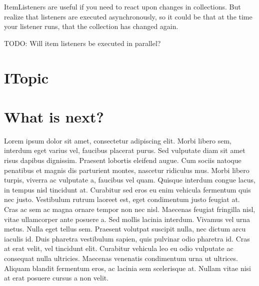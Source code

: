 ItemListeners are useful if you need to react upon changes in collections. But realize that listeners 
are executed asynchronously, so it could be that at the time your listener runs, that the collection 
has changed again.

TODO: Will item listeners be executed in parallel?

\section{ITopic}

\section{What is next?}
Lorem ipsum dolor sit amet, consectetur adipiscing elit. Morbi libero sem,
interdum eget varius vel, faucibus placerat purus. Sed vulputate diam sit amet
risus dapibus dignissim. Praesent lobortis eleifend augue. Cum sociis natoque
penatibus et magnis dis parturient montes, nascetur ridiculus mus. Morbi libero
turpis, viverra ac vulputate a, faucibus vel quam. Quisque interdum congue
lacus, in tempus nisl tincidunt at. Curabitur sed eros eu enim vehicula
fermentum quis nec justo. Vestibulum rutrum laoreet est, eget condimentum justo
feugiat at. Cras ac sem ac magna ornare tempor non nec nisl. Maecenas feugiat
fringilla nisl, vitae ullamcorper ante posuere a. Sed mollis lacinia interdum.
Vivamus vel urna metus. Nulla eget tellus sem. Praesent volutpat suscipit nulla,
nec dictum arcu iaculis id. Duis pharetra vestibulum sapien, quis pulvinar odio
pharetra id. Cras at erat velit, vel tincidunt elit. Curabitur vehicula leo eu
odio vulputate ac consequat nulla ultricies. Maecenas venenatis condimentum
urna ut ultrices. Aliquam blandit fermentum eros, ac lacinia sem scelerisque
at. Nullam vitae nisi at erat posuere cursus a non velit.
